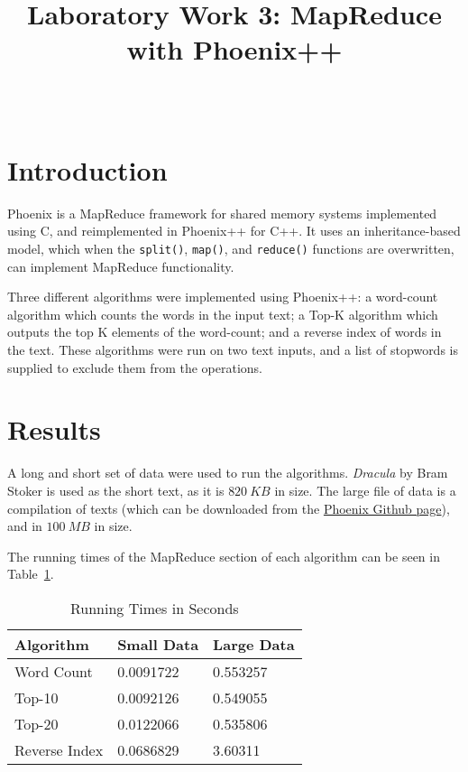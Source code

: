 \documentclass[12pt,onecolumn]{IEEEtran}
\begin{document}
	\title{Laboratory Work 3: MapReduce with Phoenix++}
	
	\author{\\
		}
	
	\maketitle
	\thispagestyle{empty}
	
	\section{Introduction}
	
	Phoenix is a MapReduce framework for shared memory systems implemented using C, and reimplemented in Phoenix++ for C++. It uses an inheritance-based model, which when the \verb|split()|, \verb|map()|, and \verb|reduce()| functions are overwritten, can implement MapReduce functionality.
	
	Three different algorithms were implemented using Phoenix++: a word-count algorithm which counts the words in the input text; a Top-K algorithm which outputs the top K elements of the word-count; and a reverse index of words in the text. These algorithms were run on two text inputs, and a list of stopwords is supplied to exclude them from the operations.
	
	\section{Results}
	
	A long and short set of data were used to run the algorithms. \textit{Dracula} by Bram Stoker is used as the short text, as it is $820~KB$ in size. The large file of data is a compilation of texts (which can be downloaded from the \href{https://github.com/kozyraki/phoenix}{Phoenix Github page}), and in $100~MB$ in size.
	
	The running times of the MapReduce section of each algorithm can be seen in Table~\ref{tbl:time}.
	
	\begin{table}[h]
		\centering \caption{Running Times in Seconds} \label{tbl:time}
		\begin{tabular}{lll}
			\hline
			Algorithm     & Small Data & Large Data \\ \hline
			Word Count    & 0.0091722  & 0.553257   \\
			Top-10        & 0.0092126  & 0.549055   \\
			Top-20        & 0.0122066  & 0.535806   \\
			Reverse Index & 0.0686829  & 3.60311    \\ \hline
		\end{tabular}
	\end{table}
\end{document}
